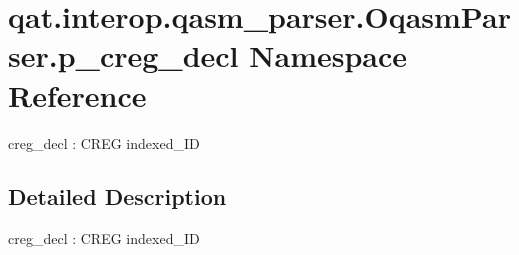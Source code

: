 \hypertarget{namespaceqat_1_1interop_1_1qasm__parser_1_1OqasmParser_1_1p__creg__decl}{\section{qat.\-interop.\-qasm\-\_\-parser.\-Oqasm\-Parser.\-p\-\_\-creg\-\_\-decl Namespace Reference}
\label{namespaceqat_1_1interop_1_1qasm__parser_1_1OqasmParser_1_1p__creg__decl}
}


creg\-\_\-decl \-: C\-R\-E\-G indexed\-\_\-\-I\-D  




\subsection{Detailed Description}
creg\-\_\-decl \-: C\-R\-E\-G indexed\-\_\-\-I\-D 